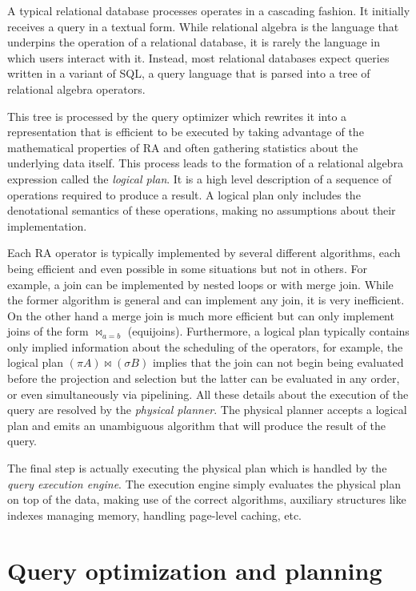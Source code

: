 A typical relational database processes operates in a cascading
fashion. It initially receives a query in a textual form. While
relational algebra is the language that underpins the operation of a
relational database, it is rarely the language in which users interact
with it. Instead, most relational databases expect queries written in a
variant of SQL, a query language that is parsed into a tree of
relational algebra operators.

This tree is processed by the query optimizer which rewrites it into a
representation that is efficient to be executed by taking advantage
of the mathematical properties of RA and often gathering statistics
about the underlying data itself. This process leads to the formation
of a relational algebra expression called the \emph{logical plan}. It
is a high level description of a sequence of operations required to
produce a result. A logical plan only includes the denotational
semantics of these operations, making no assumptions about their
implementation.

Each RA operator is typically implemented by several different
algorithms, each being efficient and even possible in some situations
but not in others. For example, a join can be implemented by nested
loops or with merge join.  While the former algorithm is general and
can implement any join, it is very inefficient. On the other hand a
merge join is much more efficient but can only implement joins of the
form \(\Join_{a=b}\) (equijoins). Furthermore, a logical plan typically
contains only implied information about the scheduling of the
operators, for example, the logical plan \((\pi A) \Join (\sigma B)\)
implies that the join can not begin being evaluated before the
projection and selection but the latter can be evaluated in any
order, or even simultaneously via pipelining. All these details about
the execution of the query are resolved by the \emph{physical
  planner}. The physical planner accepts a logical plan and emits an
unambiguous algorithm that will produce the result of the query.


The final step is actually executing the physical plan which is
handled by the \emph{query execution engine}. The execution engine
simply evaluates the physical plan on top of the data, making use of
the correct algorithms, auxiliary structures like indexes managing
memory, handling page-level caching, etc.


\section{Query optimization and planning}

